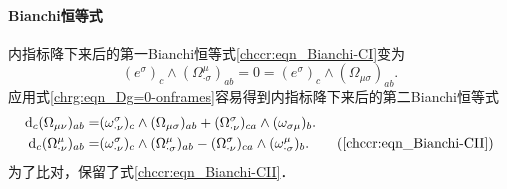 
\paragraph{Bianchi恒等式}
内指标降下来后的第一Bianchi恒等式\eqref{chccr:eqn_Bianchi-CI}变为
\begin{equation}\label{chrg:eqn_Bianchi-CI-bak}
    (e^\sigma)_c \wedge (\Omega_{\cdot \sigma} ^{\mu})_{ab} = 0 =
    (e^\sigma)_c \wedge (\Omega_{\mu \sigma} )_{ab}  .
\end{equation}
应用式\eqref{chrg:eqn_Dg=0-onframes}容易得到内指标降下来后的第二Bianchi恒等式 %
\begin{align}
    {\rm d}_c (\Omega_{\mu\nu} )_{ab} = &
       ( \omega _{\cdot \nu}^\sigma )_c \wedge (\Omega_{\mu \sigma} )_{ab}
      +(\Omega_{\cdot \nu} ^{\sigma})_{ca} \wedge (\omega_{\sigma \mu})_{b}
       . \label{chrg:eqn_Bianchi-CII-down} \\
    {\rm d}_c (\Omega_{\cdot \nu} ^{\mu})_{ab}  =&
       ( \omega _{\cdot \nu}^\sigma )_c  \wedge  (\Omega_{\cdot \sigma} ^{\mu})_{ab}
     - (\Omega_{\cdot \nu} ^{\sigma})_{ca}\wedge ( \omega _{\cdot \sigma}^\mu )_b
       . \tag{\ref{chccr:eqn_Bianchi-CII}}
\end{align}
为了比对，保留了式\eqref{chccr:eqn_Bianchi-CII}．


